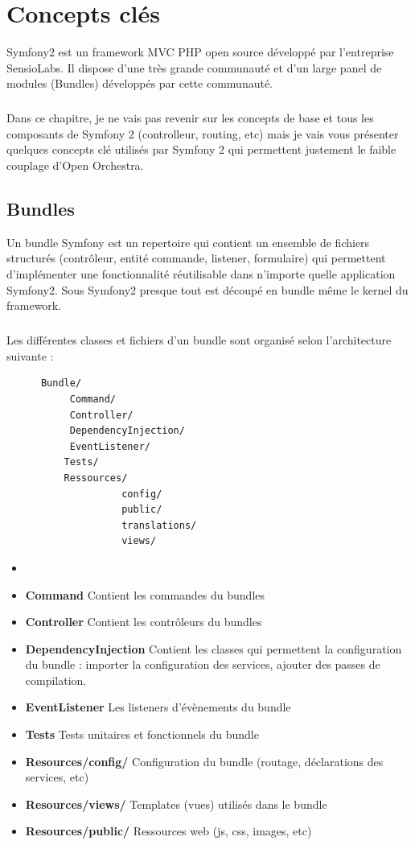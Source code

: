\chapter{Concepts clés}
Symfony2 est un framework MVC PHP open source développé par l'entreprise SensioLabs. Il dispose d'une très grande communauté et d'un large panel de modules (\og{}Bundles\fg{}) développés par cette communauté.
\paragraph{}
Dans ce chapitre, je ne vais pas revenir sur les concepts de base et tous les composants de Symfony 2 (controlleur, routing, etc) mais je vais vous présenter quelques concepts clé utilisés par Symfony 2 qui permettent justement le faible couplage d'Open Orchestra.
\section{Bundles}
\label{bundle}
Un bundle Symfony est un repertoire qui contient un ensemble de fichiers structurés (contrôleur, entité commande, listener, formulaire) qui permettent d'implémenter une fonctionnalité réutilisable dans n'importe quelle application Symfony2. Sous Symfony2 presque tout est découpé en bundle même le kernel du framework.
\paragraph{}
Les différentes classes et fichiers d'un bundle sont organisé selon l'architecture suivante : 

\begin{verbatim}
      Bundle/
           Command/  
           Controller/
           DependencyInjection/
           EventListener/
          Tests/
          Ressources/
                    config/
                    public/
                    translations/
                    views/
\end{verbatim}
\begin{itemize}
\item[]
\item \textbf{Command} Contient les commandes du bundles
\item \textbf{Controller} Contient les contrôleurs du bundles
\item \textbf{DependencyInjection} Contient les classes qui permettent la configuration du bundle : importer la configuration des services, ajouter des passes de compilation.
\item \textbf{EventListener} Les listeners d'évènements du bundle
\item \textbf{Tests} Tests unitaires et fonctionnels du bundle
\item \textbf{Resources/config/} Configuration du bundle (routage, déclarations des services, etc)
\item \textbf{Resources/views/} Templates (vues) utilisés dans le bundle
\item \textbf{Resources/public/} Ressources web (js, css, images, etc)
\end{itemize}
